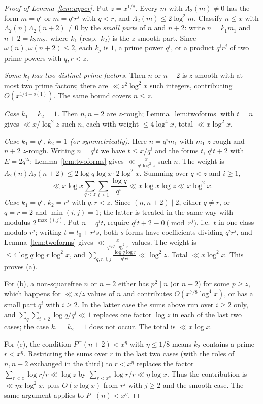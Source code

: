 \documentclass[11pt]{amsart}
\theoremstyle{definition}
\theoremstyle{remark}
\begin{document}
\begin{proof}[Proof of Lemma~\ref{lem:upper}]
Put $z=x^{1/8}$. Every $m$ with $\Lambda_2(m)\ne0$ has the form $m=q^i$ or $m=q^ir^j$ with $q<r$, and $\Lambda_2(m)\le2\log^2m$. Classify $n\le x$ with $\Lambda_2(n)\Lambda_2(n+2)\ne0$ by the \emph{small parts} of $n$ and $n+2$: write $n=k_1m_1$ and $n+2=k_2m_2$, where $k_1$ (resp.\ $k_2$) is the $z$-smooth part. Since $\omega(n),\omega(n+2)\le2$, each $k_j$ is $1$, a prime power $q^i$, or a product $q^ir^j$ of two prime powers with $q,r<z$.

\emph{Some $k_j$ has two distinct prime factors.} Then $n$ or $n+2$ is $z$-smooth with at most two prime factors; there are $\ll z^2\log^2x$ such integers, contributing $O(x^{1/4+o(1)})$. The same bound covers $n\le z$.

\emph{Case $k_1=k_2=1$.} Then $n,n+2$ are $z$-rough; Lemma~\ref{lem:twoforms} with $t=n$ gives $\ll x/\log^2z$ such $n$, each with weight $\le4\log^4x$, total $\ll x\log^2x$.

\emph{Case $k_1=q^i$, $k_2=1$ (or symmetrically).} Here $n=q^im_1$ with $m_1$ $z$-rough and $n+2$ $z$-rough. Writing $n=q^i t$ we have $t\le x/q^i$ and the forms $t$, $q^it+2$ with $E=2q^{2i}$; Lemma~\ref{lem:twoforms} gives $\ll\frac{x}{q^i\log^2z}$ such $n$. The weight is $\Lambda_2(n)\Lambda_2(n+2)\le2\log q\log x\cdot2\log^2x$. Summing over $q<z$ and $i\ge1$,
\[
\ll x\log x\sum_{q<z}\sum_{i\ge1}\frac{\log q}{q^i}\ll x\log x\log z\ll x\log^2x .
\]
\emph{Case $k_1=q^i$, $k_2=r^j$} with $q,r<z$. Since $(n,n+2)\mid2$, either $q\ne r$, or $q=r=2$ and $\min(i,j)=1$; the latter is treated in the same way with modulus $2^{\max(i,j)}$. Put $n=q^i t$, require $q^i t+2\equiv0\pmod{r^j}$, i.e.\ $t$ in one class modulo $r^j$; writing $t=t_0+r^js$, both $s$-forms have coefficients dividing $q^ir^j$, and Lemma~\ref{lem:twoforms} gives $\ll\frac{x}{q^ir^j\log^2z}$ values. The weight is $\le4\log q\log r\log^2x$, and $\sum_{q,r,i,j}\frac{\log q\log r}{q^ir^j}\ll\log^2z$. Total $\ll x\log^2x$. This proves (a).

For (b), a non-squarefree $n$ or $n+2$ either has $p^2\mid n$ (or $n+2$) for some $p\ge z$, which happens for $\ll x/z$ values of $n$ and contributes $O(x^{7/8}\log^4x)$, or has a small part $q^i$ with $i\ge2$. In the latter case the sums above run over $i\ge2$ only, and $\sum_{q}\sum_{i\ge2}\log q/q^i\ll1$ replaces one factor $\log z$ in each of the last two cases; the case $k_1=k_2=1$ does not occur. The total is $\ll x\log x$.

For (c), the condition $P^-(n+2)<x^\eta$ with $\eta\le1/8$ means $k_2$ contains a prime $r<x^\eta$. Restricting the sums over $r$ in the last two cases (with the roles of $n,n+2$ exchanged in the third) to $r<x^\eta$ replaces the factor $\sum_{r<z}\log r/r\ll\log z$ by $\sum_{r<x^\eta}\log r/r\ll\eta\log x$. Thus the contribution is $\ll\eta x\log^2x$, plus $O(x\log x)$ from $r^j$ with $j\ge2$ and the smooth case. The same argument applies to $P^-(n)<x^\eta$.
\end{proof}
\end{document}
